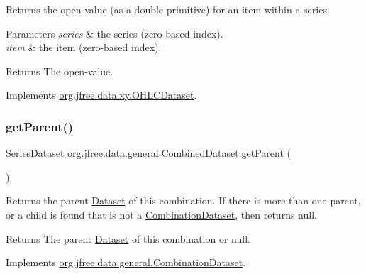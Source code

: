 Returns the open-\/value (as a double primitive) for an item within a series.


\begin{DoxyParams}{Parameters}
{\em series} & the series (zero-\/based index). \\
\hline
{\em item} & the item (zero-\/based index).\\
\hline
\end{DoxyParams}
\begin{DoxyReturn}{Returns}
The open-\/value. 
\end{DoxyReturn}


Implements \mbox{\hyperlink{interfaceorg_1_1jfree_1_1data_1_1xy_1_1_o_h_l_c_dataset_a20654fd4801bc8871dfe51bf65d62af6}{org.\+jfree.\+data.\+xy.\+O\+H\+L\+C\+Dataset}}.

\mbox{\label{classorg_1_1jfree_1_1data_1_1general_1_1_combined_dataset_a75becba98ba679e1e4fbf9b36c77ac13}} 
\subsubsection{\texorpdfstring{get\+Parent()}{getParent()}}
{\footnotesize\ttfamily \mbox{\hyperlink{interfaceorg_1_1jfree_1_1data_1_1general_1_1_series_dataset}{Series\+Dataset}} org.\+jfree.\+data.\+general.\+Combined\+Dataset.\+get\+Parent (\begin{DoxyParamCaption}{ }\end{DoxyParamCaption})}

Returns the parent \mbox{\hyperlink{interfaceorg_1_1jfree_1_1data_1_1general_1_1_dataset}{Dataset}} of this combination. If there is more than one parent, or a child is found that is not a \mbox{\hyperlink{interfaceorg_1_1jfree_1_1data_1_1general_1_1_combination_dataset}{Combination\+Dataset}}, then returns {\ttfamily null}.

\begin{DoxyReturn}{Returns}
The parent \mbox{\hyperlink{interfaceorg_1_1jfree_1_1data_1_1general_1_1_dataset}{Dataset}} of this combination or {\ttfamily null}. 
\end{DoxyReturn}


Implements \mbox{\hyperlink{interfaceorg_1_1jfree_1_1data_1_1general_1_1_combination_dataset_aba6918d290f095187907982432506bfe}{org.\+jfree.\+data.\+general.\+Combination\+Dataset}}.

